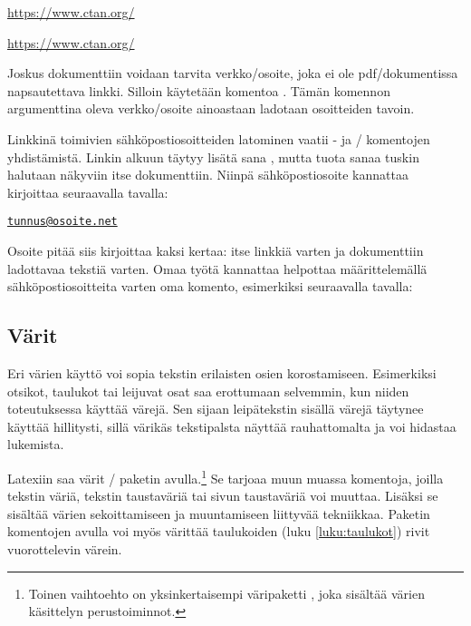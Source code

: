 \begin{koodilohkosis}
\url{https://www.ctan.org/}
\end{koodilohkosis}

\begin{tulossis}
  \url{https://www.ctan.org/}
\end{tulossis}

Joskus dokumenttiin voidaan tarvita verkko\-/osoite, joka ei ole
pdf\-/dokumentissa napsautettava linkki. Silloin käytetään komentoa
. Tämän komennon argumenttina oleva verkko\-/osoite
ainoastaan ladotaan osoitteiden tavoin.

Linkkinä toimivien sähköpostiosoitteiden latominen vaatii
- ja \-/ komentojen yhdistämistä.
Linkin alkuun täytyy lisätä sana , mutta tuota sanaa
tuskin halutaan näkyviin itse dokumenttiin. Niinpä sähköpostiosoite
kannattaa kirjoittaa seuraavalla tavalla:

\begin{koodilohkosis}
\href{mailto:tunnus@osoite.net}{\nolinkurl{tunnus@osoite.net}}
\end{koodilohkosis}

Osoite pitää siis kirjoittaa kaksi kertaa: itse linkkiä varten ja
dokumenttiin ladottavaa tekstiä varten. Omaa työtä kannattaa helpottaa
määrittelemällä sähköpostiosoitteita varten oma komento, esimerkiksi
seuraavalla tavalla:

\begin{koodilohkosis}
\newcommand{\sposti}[1]{\href{mailto:#1}{\nolinkurl{#1}}}
\end{koodilohkosis}

\subsection{Värit}
\label{luku:korostus_varit}

Eri värien käyttö voi sopia tekstin erilaisten osien korostamiseen.
Esimerkiksi otsikot, taulukot tai leijuvat osat saa erottumaan
selvemmin, kun niiden toteutuksessa käyttää värejä. Sen sijaan
leipätekstin sisällä värejä täytynee käyttää hillitysti, sillä värikäs
tekstipalsta näyttää rauhattomalta ja voi hidastaa lukemista.

Latexiin saa värit \-/ paketin
avulla.\footnote{Toinen vaihtoehto on yksinkertaisempi väripaketti
  , joka sisältää värien käsittelyn perustoiminnot.} Se
tarjoaa muun muassa komentoja, joilla tekstin väriä, tekstin taustaväriä
tai sivun taustaväriä voi muuttaa. Lisäksi se sisältää värien
sekoittamiseen ja muuntamiseen liittyvää tekniikkaa. Paketin komentojen
avulla voi myös värittää taulukoiden (luku \ref{luku:taulukot}) rivit
vuorottelevin värein.

